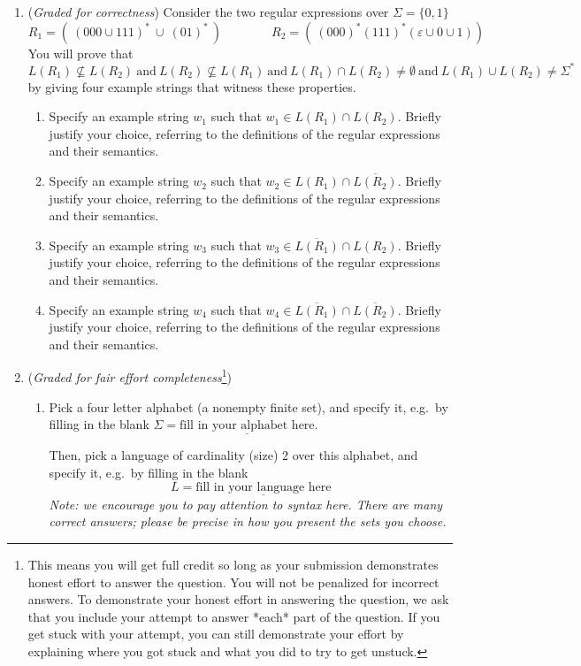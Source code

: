 \documentclass[12pt, oneside]{article}
\begin{document}
\begin{enumerate}
\item ({\it Graded for correctness})
Consider the two regular expressions over $\Sigma = \{ 0, 1 \}$
\[
R_1 = (~(000 \cup 111)^* ~\cup~ (01)^*~)
\qquad \qquad
R_2 = (~(000)^*(111)^* (\varepsilon \cup 0\cup1))
\]
You will prove that 
\[
L(R_1) \not \subseteq L(R_2) ~ \text{and} ~ L(R_2) \not \subseteq L(R_1)  
~ \text{and} ~ L(R_1) \cap L(R_2)  \neq \emptyset
~ \text{and} ~ L(R_1) \cup L(R_2)  \neq \Sigma^*
\]
by giving four example strings that witness these properties.
\begin{enumerate}
\item Specify an example string $w_1$ such that $w_1 \in L(R_1) \cap L(R_2)$.
 Briefly justify your choice, referring to the definitions of the regular expressions and their semantics.
\item Specify an example string $w_2$ such that $w_2 \in L(R_1) \cap \overline{L(R_2)}$.
Briefly justify your choice, referring to the definitions of the regular expressions and their semantics.
\item Specify an example string $w_3$ such that $w_3 \in \overline{L(R_1)} \cap L(R_2)$.
Briefly justify your choice, referring to the definitions of the regular expressions and their semantics.
\item Specify an example string $w_4$ such that $w_4 \in \overline{L(R_1)} \cap \overline{L(R_2)}$.
Briefly justify your choice, referring to the definitions of the regular expressions and their semantics.
\end{enumerate}


\item  ({\it Graded for fair effort completeness}\footnote{This means 
you will get full credit so long as your submission demonstrates honest 
effort to answer the question. You will not be penalized for incorrect answers. 
To demonstrate your honest effort in answering the question, we ask that you 
include your attempt to answer *each* part of the question. If you get stuck 
with your attempt, you can still demonstrate your effort by explaining where 
you got stuck and what you did to try to get unstuck. }) 
\begin{enumerate}
\item Pick a four letter alphabet (a nonempty finite set), and specify it, e.g.\ by filling in the blank 
$\Sigma =  \underline{\text{fill in your alphabet here}}$.

Then, pick a language of cardinality (size) $2$ over this alphabet, and specify it, e.g.\ by filling in the blank
\[
L =  \underline{\text{fill in your language here}}
\]
{\it Note: we encourage you to pay attention to syntax here.  There are many correct answers; please be 
precise in how you present the sets you choose.}


\end{enumerate}
\end{enumerate}
\end{document}
